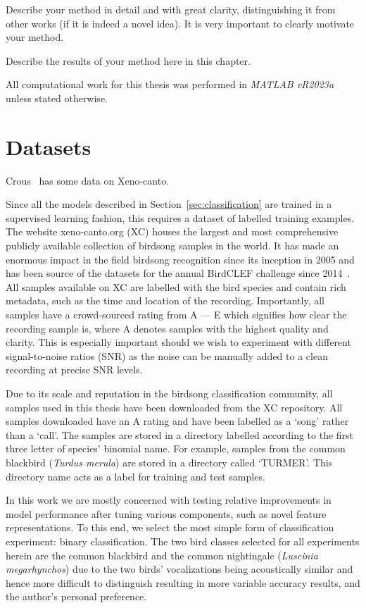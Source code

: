 Describe your method in detail and with great clarity, distinguishing it from
other works (if it is indeed a novel idea). It is very important to clearly
motivate your method.

Describe the results of your method here in this chapter.

All computational work for this thesis was performed in \textit{MATLAB vR2023a}
unless stated otherwise.

\section{Datasets}

Crous~\cite{crous2019polyphonic} has some data on Xeno-canto.

Since all the models described in Section~\ref{sec:classification} are trained
in a supervised learning fashion, this requires a dataset of labelled training
examples. The website xeno-canto.org (XC) houses the largest and most
comprehensive publicly available collection of birdsong samples in the world. It
has made an enormous impact in the field birdsong recognition since its
inception in 2005 and has been source of the datasets for the annual BirdCLEF
challenge since 2014~\cite{vellinga2015xeno}. All samples available on XC are
labelled with the bird species and contain rich metadata, such as the time and
location of the recording. Importantly, all samples have a crowd-sourced rating
from A --- E which signifies how clear the recording sample is, where A denotes
samples with the highest quality and clarity. This is especially important
should we wish to experiment with different signal-to-noise ratios (SNR) as the
noise can be manually added to a clean recording at precise SNR levels. 

Due to its scale and reputation in the birdsong classification community, all
samples used in this thesis have been downloaded from the XC repository. All
samples downloaded have an A rating and have been labelled as a `song' rather
than a `call'. The samples are stored in a directory labelled according to the
first three letter of species' binomial name. For example, samples from the
common blackbird (\textit{Turdus merula}) are stored in a directory called
`TURMER'. This directory name acts as a label for training and test samples.

In this work we are mostly concerned with testing relative improvements in model
performance after tuning various components, such as novel feature
representations. To this end, we select the most simple form of classification
experiment: binary classification. The two bird classes selected for all
experiments herein are the common blackbird and the common nightingale
(\textit{Luscinia megarhynchos}) due to the two birds' vocalizations being
acoustically similar and hence more difficult to distinguish resulting in more
variable accuracy results, and the author's personal preference.

